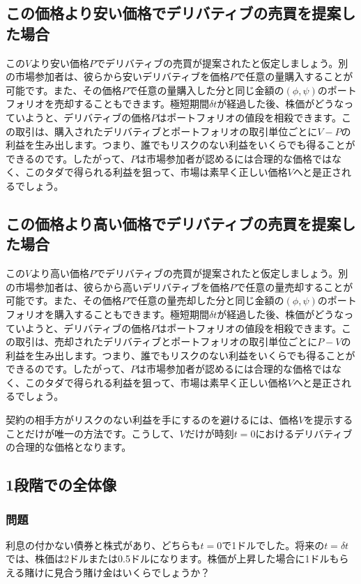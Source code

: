 \documentclass[uplatex,a4j,12pt,dvipdfmx]{jsarticle}
\begin{document}
\subsection{この価格より安い価格でデリバティブの売買を提案した場合}
この$V$より安い価格$P$でデリバティブの売買が提案されたと仮定しましょう。別の市場参加者は、彼らから安いデリバティブを価格$P$で任意の量購入することが可能です。また、その価格$P$で任意の量購入した分と同じ金額の$(\phi, \psi)$のポートフォリオを売却することもできます。極短期間$\delta t$が経過した後、株価がどうなっていようと、デリバティブの価格$P$はポートフォリオの値段を相殺できます。この取引は、購入されたデリバティブとポートフォリオの取引単位ごとに$V-P$の利益を生み出します。つまり、誰でもリスクのない利益をいくらでも得ることができるのです。したがって、$P$は市場参加者が認めるには合理的な価格ではなく、このタダで得られる利益を狙って、市場は素早く正しい価格$V$へと是正されるでしょう。

\subsection{この価格より高い価格でデリバティブの売買を提案した場合}
この$V$より高い価格$P$でデリバティブの売買が提案されたと仮定しましょう。別の市場参加者は、彼らから高いデリバティブを価格$P$で任意の量売却することが可能です。また、その価格$P$で任意の量売却した分と同じ金額の$(\phi, \psi)$のポートフォリオを購入することもできます。極短期間$\delta t$が経過した後、株価がどうなっていようと、デリバティブの価格$P$はポートフォリオの値段を相殺できます。この取引は、売却されたデリバティブとポートフォリオの取引単位ごとに$P-V$の利益を生み出します。つまり、誰でもリスクのない利益をいくらでも得ることができるのです。したがって、$P$は市場参加者が認めるには合理的な価格ではなく、このタダで得られる利益を狙って、市場は素早く正しい価格$V$へと是正されるでしょう。

契約の相手方がリスクのない利益を手にするのを避けるには、価格$V$を提示することだけが唯一の方法です。こうして、$V$だけが時刻$t=0$におけるデリバティブの合理的な価格となります。

\subsection{1段階での全体像}
\subsubsection{問題}
利息の付かない債券と株式があり、どちらも$t=0$で1ドルでした。将来の$t=\delta t$では、株価は2ドルまたは0.5ドルになります。株価が上昇した場合に1ドルもらえる賭けに見合う賭け金はいくらでしょうか？
\end{document}
